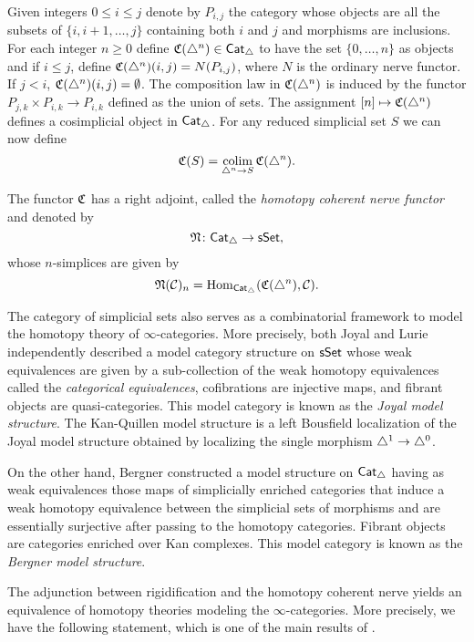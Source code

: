 Given integers $0 \leq i \leq j$ denote by $P_{i,j}$ the category whose objects are all the subsets of $\{i, i+1, \dots, j\}$ containing both $i$ and $j$ and morphisms are inclusions.
For each integer $n \geq 0$ define $\operatorname{\mathfrak{C}}(\triangle^n) \in \mathsf{Cat}_{\triangle}$ to have the set $\{0, \dots, n\}$ as objects and if $i \leq j$, define $\operatorname{\mathfrak{C}}(\triangle^n)(i,j)= N(P_{i,j})$, where $N$ is the ordinary nerve functor.
If $j < i$, $\operatorname{\mathfrak{C}}(\triangle^n)(i,j) = \emptyset$.
The composition law in $\operatorname{\mathfrak{C}}(\triangle^n)$ is induced by the functor $P_{j,k} \times P_{i,k} \to P_{i,k}$ defined as the union of sets.
The assignment $[n] \mapsto \operatorname{\mathfrak{C}}(\triangle^n)$ defines a cosimplicial object in $\mathsf{Cat}_{\triangle}$.
For any reduced simplicial set $S$ we can now define
\[
\operatorname{\mathfrak{C}}(S) = \operatorname*{colim}_{\triangle^n \to S} \operatorname{\mathfrak{C}}(\triangle^n).
\]

The functor $\operatorname{\mathfrak{C}}$ has a right adjoint, called the \textit{homotopy coherent nerve functor} and denoted by
\[
\operatorname{\mathfrak{N}} \colon \mathsf{Cat}_{\triangle} \to \mathsf{sSet},
\]
whose $n$-simplices are given by
\[
\operatorname{\mathfrak{N}}(\mathcal{C})_n = \mathrm{Hom}_{\mathsf{Cat}_{\triangle}}(\operatorname{\mathfrak{C}}(\triangle^n), \mathcal{C}).
\]

The category of simplicial sets also serves as a combinatorial framework to model the homotopy theory of $\infty$-categories.
More precisely, both Joyal and Lurie independently described a model category structure on $\mathsf{sSet}$ whose weak equivalences are given by a sub-collection of the weak homotopy equivalences called the \textit{categorical equivalences}, cofibrations are injective maps, and fibrant objects are quasi-categories.
This model category is known as the \textit{Joyal model structure}.
The Kan-Quillen model structure is a left Bousfield localization of the Joyal model structure obtained by localizing the single morphism $\triangle^1 \to \triangle^0$.

On the other hand, Bergner constructed a model structure on $\mathsf{Cat}_{\triangle}$ having as weak equivalences those maps of simplicially enriched categories that induce a weak homotopy equivalence between the simplicial sets of morphisms and are essentially surjective after passing to the homotopy categories.
Fibrant objects are categories enriched over Kan complexes.
This model category is known as the \textit{Bergner model structure}.

The adjunction between rigidification and the homotopy coherent nerve yields an equivalence of homotopy theories modeling the $\infty$-categories.
More precisely, we have the following statement, which is one of the main results of \cite{dugger2011mappingspaces}.

